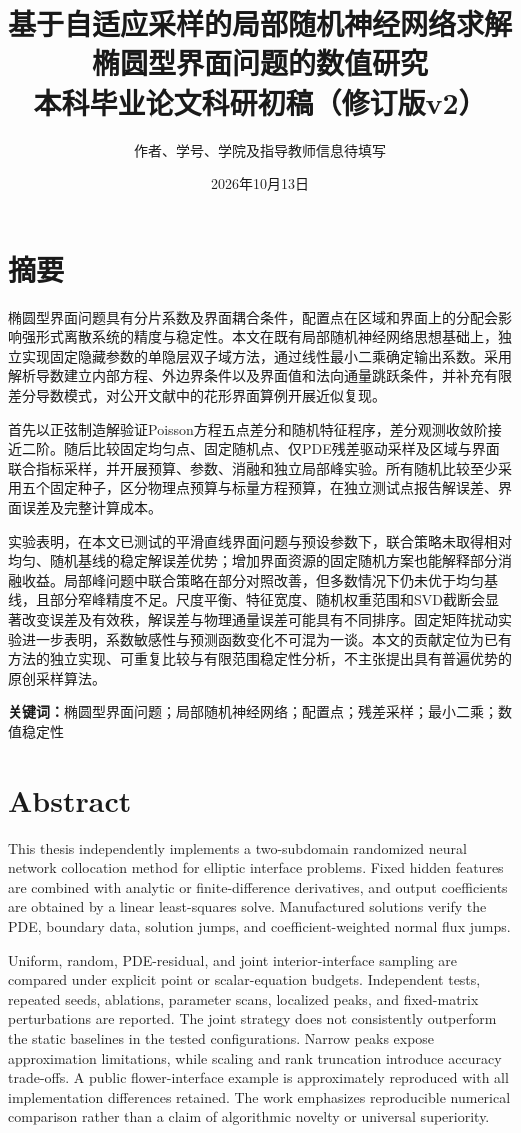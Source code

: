 \documentclass[UTF8,12pt,oneside]{ctexbook}
\title{基于自适应采样的局部随机神经网络求解椭圆型界面问题的数值研究\\[1em]\large 本科毕业论文科研初稿（修订版v2）}
\author{作者、学号、学院及指导教师信息待填写}
\date{2026年10月13日}
\theoremstyle{definition}
\begin{document}
\frontmatter
\maketitle
\chapter*{摘要}
椭圆型界面问题具有分片系数及界面耦合条件，配置点在区域和界面上的分配会影响强形式离散系统的精度与稳定性。本文在既有局部随机神经网络思想基础上，独立实现固定隐藏参数的单隐层双子域方法，通过线性最小二乘确定输出系数。采用解析导数建立内部方程、外边界条件以及界面值和法向通量跳跃条件，并补充有限差分导数模式，对公开文献中的花形界面算例开展近似复现。

首先以正弦制造解验证Poisson方程五点差分和随机特征程序，差分观测收敛阶接近二阶。随后比较固定均匀点、固定随机点、仅PDE残差驱动采样及区域与界面联合指标采样，并开展预算、参数、消融和独立局部峰实验。所有随机比较至少采用五个固定种子，区分物理点预算与标量方程预算，在独立测试点报告解误差、界面误差及完整计算成本。

实验表明，在本文已测试的平滑直线界面问题与预设参数下，联合策略未取得相对均匀、随机基线的稳定解误差优势；增加界面资源的固定随机方案也能解释部分消融收益。局部峰问题中联合策略在部分对照改善，但多数情况下仍未优于均匀基线，且部分窄峰精度不足。尺度平衡、特征宽度、随机权重范围和SVD截断会显著改变误差及有效秩，解误差与物理通量误差可能具有不同排序。固定矩阵扰动实验进一步表明，系数敏感性与预测函数变化不可混为一谈。本文的贡献定位为已有方法的独立实现、可重复比较与有限范围稳定性分析，不主张提出具有普遍优势的原创采样算法。

\noindent\textbf{关键词：}椭圆型界面问题；局部随机神经网络；配置点；残差采样；最小二乘；数值稳定性
\chapter*{Abstract}
This thesis independently implements a two-subdomain randomized neural network collocation method for elliptic interface problems. Fixed hidden features are combined with analytic or finite-difference derivatives, and output coefficients are obtained by a linear least-squares solve. Manufactured solutions verify the PDE, boundary data, solution jumps, and coefficient-weighted normal flux jumps.

Uniform, random, PDE-residual, and joint interior-interface sampling are compared under explicit point or scalar-equation budgets. Independent tests, repeated seeds, ablations, parameter scans, localized peaks, and fixed-matrix perturbations are reported. The joint strategy does not consistently outperform the static baselines in the tested configurations. Narrow peaks expose approximation limitations, while scaling and rank truncation introduce accuracy trade-offs. A public flower-interface example is approximately reproduced with all implementation differences retained. The work emphasizes reproducible numerical comparison rather than a claim of algorithmic novelty or universal superiority.
\end{document}

